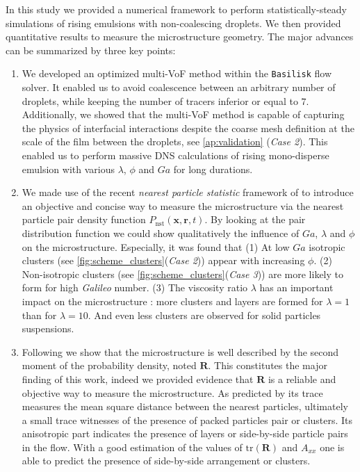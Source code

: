 
In this study we provided a numerical framework to perform statistically-steady simulations of rising emulsions with non-coalescing droplets. 
We then provided quantitative results to measure the microstructure geometry.
The major advances can be summarized by three key points:
\begin{enumerate}
    \item We developed an optimized multi-VoF method within the \texttt{Basilisk} flow solver. 
    It enabled us to avoid coalescence between an arbitrary number of droplets, while keeping the number of tracers inferior or equal to $7$. 
    Additionally, we showed that the multi-VoF method is capable of capturing the physics of interfacial interactions despite the coarse mesh definition at the scale of the film between the droplets, see \ref{ap:validation} (\textit{Case 2}). 
    This enabled us to perform massive DNS calculations of rising mono-disperse emulsion with various $\lambda$, $\phi$ and $Ga$ for long durations.
    \item We made use of the recent \textit{nearest particle statistic} framework of \citet{zhang2023evolution} to introduce an objective and concise way to measure the microstructure via the nearest particle pair density function $P_\text{nst}(\textbf{x},\textbf{r},t)$. 
    By looking at the pair distribution function we could show qualitatively the influence of $Ga$, $\lambda$ and $\phi$ on the microstructure.
    Especially, it was found that 
    (1) At low $Ga$ isotropic clusters (see \ref{fig:scheme_clusters}(\textit{Case 2})) appear with increasing $\phi$. 
    (2) Non-isotropic clusters (see \ref{fig:scheme_clusters}(\textit{Case 3})) are more likely to form for high \textit{Galileo} number.
    (3) The viscosity ratio $\lambda$ has an important impact on the microstructure : more clusters and layers are formed for $\lambda = 1$ than for $\lambda = 10$. 
    And even less clusters are observed for solid particles suspensions. 
    \item Following \citet{zhang2023evolution} we show that the microstructure is well described by the second moment of the probability density, noted $\textbf{R}$. 
    This constitutes the major finding of this work, indeed we provided evidence that $\textbf{R}$ is a reliable and objective way to measure the microstructure.
    As predicted by \citet{zhang2023evolution} its trace measures the mean square distance between the nearest particles, ultimately a small trace witnesses of the presence of packed particles pair or clusters.
    Its anisotropic part indicates the presence of layers or side-by-side particle pairs in the flow. 
    With a good estimation of the values of $\text{tr}(\textbf{R})$ and $A_{xx}$ one is able to predict the presence of side-by-side arrangement or clusters.
\end{enumerate}
